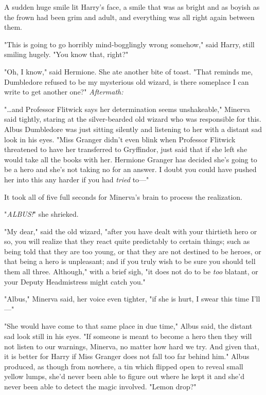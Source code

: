A sudden huge smile lit Harry's face, a smile that was as bright and as boyish 
as the frown had been grim and adult, and everything was all right again 
between them.

"This is going to go horribly mind-bogglingly wrong somehow," said Harry, still 
smiling hugely. "You know that, right?"

"Oh, I know," said Hermione. She ate another bite of toast. "That reminds me, 
Dumbledore refused to be my mysterious old wizard, is there someplace I can 
write to get another one?"
\sbreak
\emph{Aftermath:}

"{\ldots}and Professor Flitwick says her determination seems unshakeable," 
Minerva said tightly, staring at the silver-bearded old wizard who was 
responsible for this. Albus Dumbledore was just sitting silently and listening 
to her with a distant sad look in his eyes. "Miss Granger didn't even blink 
when Professor Flitwick threatened to have her transferred to Gryffindor, just 
said that if she left she would take all the books with her. Hermione Granger 
has decided she's going to be a hero and she's not taking no for an answer. I 
doubt you could have pushed her into this any harder if you had \emph{tried} 
to---"

It took all of five full seconds for Minerva's brain to process the realization.

"\emph{ALBUS!}" she shrieked.

"My dear," said the old wizard, "after you have dealt with your thirtieth hero 
or so, you will realize that they react quite predictably to certain things; 
such as being told that they are too young, or that they are not destined to be 
heroes, or that being a hero is unpleasant; and if you truly wish to be sure 
you should tell them all three. Although," with a brief sigh, "it does not do 
to be \emph{too} blatant, or your Deputy Headmistress might catch you."

"Albus," Minerva said, her voice even tighter, "if she is hurt, I swear this 
time I'll---"

"She would have come to that same place in due time," Albus said, the distant 
sad look still in his eyes. "If someone is meant to become a hero then they 
will not listen to our warnings, Minerva, no matter how hard we try. And given 
that, it is better for Harry if Miss Granger does not fall too far behind him." 
Albus produced, as though from nowhere, a tin which flipped open to reveal 
small yellow lumps, she'd never been able to figure out where he kept it and 
she'd never been able to detect the magic involved. "Lemon drop?"

